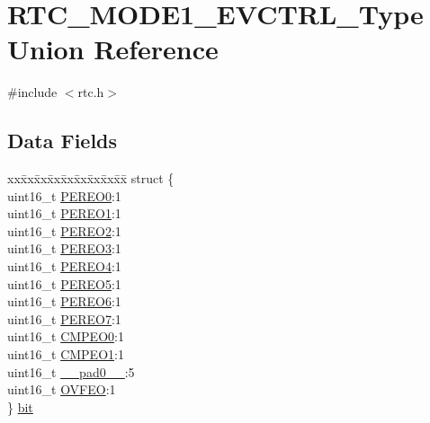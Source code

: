\hypertarget{union_r_t_c___m_o_d_e1___e_v_c_t_r_l___type}{}\section{R\+T\+C\+\_\+\+M\+O\+D\+E1\+\_\+\+E\+V\+C\+T\+R\+L\+\_\+\+Type Union Reference}
\label{union_r_t_c___m_o_d_e1___e_v_c_t_r_l___type}


{\ttfamily \#include $<$rtc.\+h$>$}

\subsection*{Data Fields}
\begin{DoxyCompactItemize}
\item 
\begin{tabbing}
xx\=xx\=xx\=xx\=xx\=xx\=xx\=xx\=xx\=\kill
struct \{\\
\>uint16\_t \mbox{\hyperlink{union_r_t_c___m_o_d_e1___e_v_c_t_r_l___type_a038cf8cfc1288382b89f2a9eb8dc61d1}{PEREO0}}:1\\
\>uint16\_t \mbox{\hyperlink{union_r_t_c___m_o_d_e1___e_v_c_t_r_l___type_a5d14d8ffdf50889eaf20c044b17d5e93}{PEREO1}}:1\\
\>uint16\_t \mbox{\hyperlink{union_r_t_c___m_o_d_e1___e_v_c_t_r_l___type_a97880ca3fc48b61978115b9b2ccbe83f}{PEREO2}}:1\\
\>uint16\_t \mbox{\hyperlink{union_r_t_c___m_o_d_e1___e_v_c_t_r_l___type_a5c520f909edfd0b7aac696401e7dd0b6}{PEREO3}}:1\\
\>uint16\_t \mbox{\hyperlink{union_r_t_c___m_o_d_e1___e_v_c_t_r_l___type_a586ce89832afa164a4f8e2964b85e939}{PEREO4}}:1\\
\>uint16\_t \mbox{\hyperlink{union_r_t_c___m_o_d_e1___e_v_c_t_r_l___type_a5b9fe3e4351dadf30cc294f6fb3005e9}{PEREO5}}:1\\
\>uint16\_t \mbox{\hyperlink{union_r_t_c___m_o_d_e1___e_v_c_t_r_l___type_a08cf324e465c485498d57c5746df14b7}{PEREO6}}:1\\
\>uint16\_t \mbox{\hyperlink{union_r_t_c___m_o_d_e1___e_v_c_t_r_l___type_a0118b512cae84cadf15a886f3e7a39b6}{PEREO7}}:1\\
\>uint16\_t \mbox{\hyperlink{union_r_t_c___m_o_d_e1___e_v_c_t_r_l___type_aba8e5ae30e06c023cae87e8ceb1dbc19}{CMPEO0}}:1\\
\>uint16\_t \mbox{\hyperlink{union_r_t_c___m_o_d_e1___e_v_c_t_r_l___type_a25836385918d185da93995e2977e140e}{CMPEO1}}:1\\
\>uint16\_t \mbox{\hyperlink{union_r_t_c___m_o_d_e1___e_v_c_t_r_l___type_a77132c2c26a75f5b8751b235cda23828}{\_\_pad0\_\_}}:5\\
\>uint16\_t \mbox{\hyperlink{union_r_t_c___m_o_d_e1___e_v_c_t_r_l___type_ad5675910f0a67704471b8e7f6ea2014e}{OVFEO}}:1\\
\} \mbox{\hyperlink{union_r_t_c___m_o_d_e1___e_v_c_t_r_l___type_a4573e580e4a3025553c77d051c629eca}{bit}}\\


\end{tabbing}
\end{DoxyCompactItemize}
